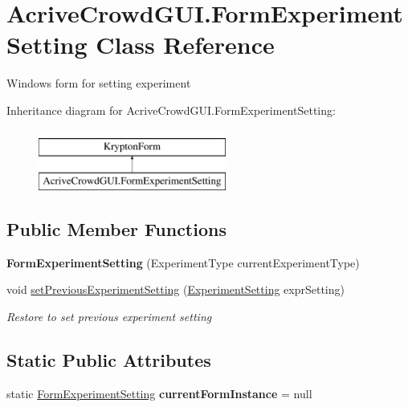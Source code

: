 \hypertarget{class_acrive_crowd_g_u_i_1_1_form_experiment_setting}{}\section{Acrive\+Crowd\+G\+U\+I.\+Form\+Experiment\+Setting Class Reference}
\label{class_acrive_crowd_g_u_i_1_1_form_experiment_setting}


Windows form for setting experiment  


Inheritance diagram for Acrive\+Crowd\+G\+U\+I.\+Form\+Experiment\+Setting\+:\begin{figure}[H]
\begin{center}
\leavevmode
\includegraphics[height=2.000000cm]{class_acrive_crowd_g_u_i_1_1_form_experiment_setting}
\end{center}
\end{figure}
\subsection*{Public Member Functions}
\begin{DoxyCompactItemize}
\item 
\hypertarget{class_acrive_crowd_g_u_i_1_1_form_experiment_setting_aeee8426835238261706b5a6fb7115fb1}{}{\bfseries Form\+Experiment\+Setting} (Experiment\+Type current\+Experiment\+Type)\label{class_acrive_crowd_g_u_i_1_1_form_experiment_setting_aeee8426835238261706b5a6fb7115fb1}

\item 
void \hyperlink{class_acrive_crowd_g_u_i_1_1_form_experiment_setting_a280fe3d4a84125f8a9d79abaa15aa45d}{set\+Previous\+Experiment\+Setting} (\hyperlink{class_acrive_crowd_g_u_i_1_1_experiment_setting}{Experiment\+Setting} expr\+Setting)
\begin{DoxyCompactList}\small\item\em Restore to set previous experiment setting \end{DoxyCompactList}\end{DoxyCompactItemize}
\subsection*{Static Public Attributes}
\begin{DoxyCompactItemize}
\item 
\hypertarget{class_acrive_crowd_g_u_i_1_1_form_experiment_setting_aec601cc6fcfd266d059e5c1ea9a47137}{}static \hyperlink{class_acrive_crowd_g_u_i_1_1_form_experiment_setting}{Form\+Experiment\+Setting} {\bfseries current\+Form\+Instance} = null\label{class_acrive_crowd_g_u_i_1_1_form_experiment_setting_aec601cc6fcfd266d059e5c1ea9a47137}

\end{DoxyCompactItemize}
